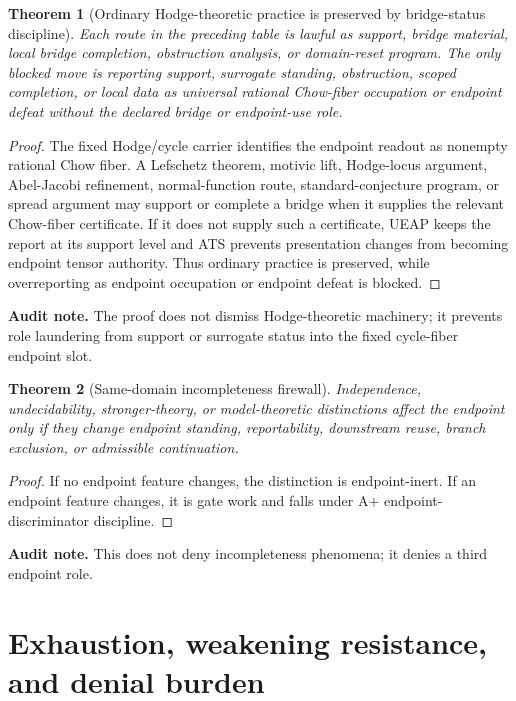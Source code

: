 \documentclass[11pt]{article}
\newtheorem{theorem}{Theorem}[section]
\begin{document}
\begin{theorem}[Ordinary Hodge-theoretic practice is preserved by bridge-status discipline]
Each route in the preceding table is lawful as support, bridge material, local bridge completion, obstruction analysis, or domain-reset program.  The only blocked move is reporting support, surrogate standing, obstruction, scoped completion, or local data as universal rational Chow-fiber occupation or endpoint defeat without the declared bridge or endpoint-use role.
\end{theorem}
\begin{proof}
The fixed Hodge/cycle carrier identifies the endpoint readout as nonempty rational Chow fiber.  A Lefschetz theorem, motivic lift, Hodge-locus argument, Abel-Jacobi refinement, normal-function route, standard-conjecture program, or spread argument may support or complete a bridge when it supplies the relevant Chow-fiber certificate.  If it does not supply such a certificate, UEAP keeps the report at its support level and ATS prevents presentation changes from becoming endpoint tensor authority.  Thus ordinary practice is preserved, while overreporting as endpoint occupation or endpoint defeat is blocked.
\end{proof}
\par\noindent\textbf{Audit note.} The proof does not dismiss Hodge-theoretic machinery; it prevents role laundering from support or surrogate status into the fixed cycle-fiber endpoint slot.

\begin{theorem}[Same-domain incompleteness firewall]
Independence, undecidability, stronger-theory, or model-theoretic distinctions affect the endpoint only if they change endpoint standing, reportability, downstream reuse, branch exclusion, or admissible continuation.
\end{theorem}
\begin{proof}
If no endpoint feature changes, the distinction is endpoint-inert. If an endpoint feature changes, it is gate work and falls under A+ endpoint-discriminator discipline.
\end{proof}
\par\noindent\textbf{Audit note.} This does not deny incompleteness phenomena; it denies a third endpoint role.



\section{Exhaustion, weakening resistance, and denial burden}
\end{document}
